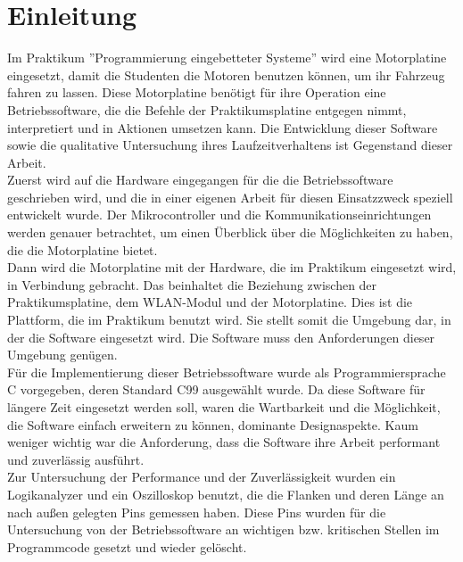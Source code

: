\chapter{Einleitung}

Im Praktikum ''Programmierung eingebetteter Systeme'' wird eine Motorplatine \cite{STUD_TIMO}
eingesetzt, damit die Studenten die Motoren benutzen können, um ihr Fahrzeug
fahren zu lassen. Diese Motorplatine benötigt für ihre Operation eine
Betriebssoftware, die die Befehle der Praktikumsplatine entgegen nimmt,
interpretiert und in Aktionen umsetzen kann. Die Entwicklung dieser Software
sowie die qualitative Untersuchung ihres Laufzeitverhaltens ist Gegenstand
dieser Arbeit.\\
Zuerst wird auf die Hardware eingegangen für die die Betriebssoftware geschrieben wird,
und die in einer eigenen Arbeit für diesen Einsatzzweck speziell entwickelt wurde.
Der Mikrocontroller und die Kommunikationseinrichtungen werden genauer betrachtet, um
einen Überblick über die Möglichkeiten zu haben, die die Motorplatine bietet.\\
Dann wird die Motorplatine mit der Hardware, die im Praktikum eingesetzt wird, in Verbindung
gebracht. Das beinhaltet die Beziehung zwischen der Praktikumsplatine, dem WLAN-Modul und der
Motorplatine. Dies ist die Plattform, die im Praktikum benutzt wird. Sie stellt somit die
Umgebung dar, in der die Software eingesetzt wird. Die Software muss den Anforderungen
dieser Umgebung genügen.\\
Für die Implementierung dieser Betriebssoftware wurde als Programmiersprache
C \cite{C_PROG} vorgegeben, deren Standard C99 ausgewählt wurde. Da diese
Software für längere Zeit eingesetzt werden soll, waren die
Wartbarkeit und die Möglichkeit, die Software einfach erweitern zu können,
dominante Designaspekte. Kaum weniger wichtig war die Anforderung, dass die Software
ihre Arbeit performant und zuverlässig ausführt.\\
Zur Untersuchung der Performance und der Zuverlässigkeit wurden ein Logikanalyzer und ein
Oszilloskop benutzt, die die Flanken und deren Länge
an nach außen gelegten Pins gemessen haben. Diese Pins wurden für die Untersuchung von der
Betriebssoftware an wichtigen bzw. kritischen Stellen im Programmcode gesetzt und wieder gelöscht.
